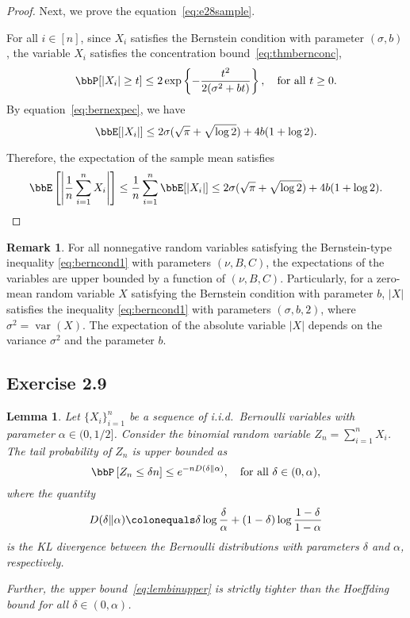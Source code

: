 \documentclass[11pt]{article}
\DeclareMathOperator{\var}{var}
\newcommand{\of}[1]{\left(#1\right)}
\newcommand{\off}[1]{\left[#1\right]}
\newcommand{\offf}[1]{\left\{#1\right\}}
\newcommand{\aabs}[1]{\left|#1\right|}
\theoremstyle{plain}
\newtheorem{lem}{Lemma}
\theoremstyle{definition}
\newtheorem{rmk}{Remark}
\begin{document}
\begin{proof}
	\vspace{0.2cm}
	Next, we prove the equation~\eqref{eq:e28sample}.
	
	\vspace{0.2cm}
	For all $i \in [n]$, since $X_i$ satisfies the Bernstein condition with parameter $(\sigma,b)$, the variable $X_i$ satisfies the concentration bound~\eqref{eq:thmbernconc},
	\begin{equation}
		\bbP[|X_i| \geq t] \leq 2 \exp \offf{- \frac{t^2}{2(\sigma^2 + bt)}}, \quad \text{for all }t \geq 0. 
	\end{equation}
	By equation~\eqref{eq:bernexpec}, we have
	\begin{equation}
		\bbE[|X_i|] \leq  2 \sigma (\sqrt{\pi} + \sqrt{\log 2}) + 4b (1 + \log 2).
	\end{equation}
	
	Therefore, the expectation of the sample mean satisfies
	\begin{equation}
		\bbE \off{ \aabs{\frac{1}{n} \sum_{i=1}^n X_i }} \leq \frac{1}{n} \sum_{i=1}^n \bbE[|X_i|] \leq 2 \sigma (\sqrt{\pi} + \sqrt{\log 2}) + 4b (1 + \log 2).
	\end{equation}
	
\end{proof}

\begin{rmk}
	For all nonnegative random variables satisfying the Bernstein-type inequality \eqref{eq:berncond1} with parameters $(\nu,B,C)$, the expectations of the variables are upper bounded by a function of $(\nu,B,C)$. Particularly, for a zero-mean random variable $X$ satisfying the Bernstein condition with parameter $b$, $|X|$ satisfies the inequality \eqref{eq:berncond1} with parameters $(\sigma,b,2)$, where $\sigma^2 = \var(X)$.  The expectation of the absolute variable $|X|$ depends on the variance $\sigma^2$ and the parameter $b$.
\end{rmk}

\subsection{Exercise 2.9}
\begin{lem}
	Let $\{X_i\}_{i=1}^n$ be a sequence of i.i.d.\ Bernoulli variables with parameter $\alpha \in (0,1/2]$. Consider the binomial random variable $Z_n = \sum_{i=1}^n X_i$. The tail probability of $Z_n$ is upper bounded as
	\begin{equation}\label{eq:lembinupper}
		\bbP\off{Z_n \leq \delta n} \leq e^{-n D\of{\delta \Vert \alpha}}, \quad \text{for all }\delta \in (0,\alpha),
	\end{equation}
	where the quantity 
	\begin{equation}
		D(\delta \Vert \alpha) \colonequals \delta \log \frac{\delta}{\alpha} + (1-\delta) \log \frac{1-\delta}{1-\alpha}
	\end{equation}
	is the KL divergence between the Bernoulli distributions with parameters $\delta$ and $\alpha$, respectively.
	
	Further, the upper bound~\eqref{eq:lembinupper} is strictly tighter than the Hoeffding bound for all $\delta \in (0,\alpha)$.
\end{lem}
\end{document}
